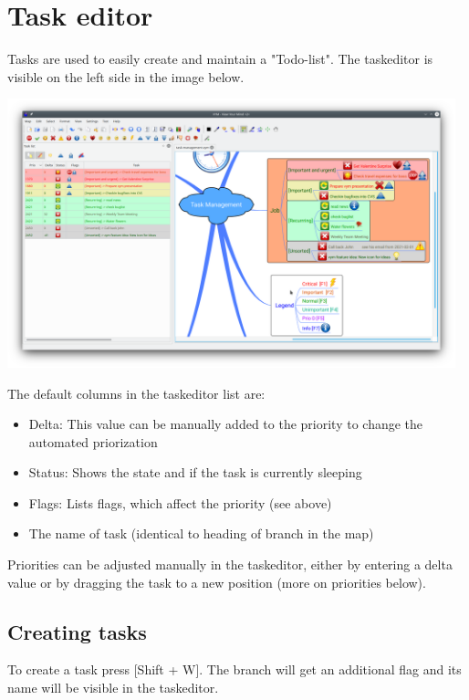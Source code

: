 \documentclass[12pt,a4paper]{article}
\newcommand{\key}[1]{[#1]}
\begin{document}
\section{Task editor} \label{taskeditor}
Tasks are used to easily create and maintain a "Todo-list". 
The taskeditor is visible on the left side in the image below. 
\begin{center}
    \includegraphics[width=13cm]{images/taskeditor.png}
\end{center}

The default columns in the taskeditor list are:
\begin{itemize}
    \item Delta: This value can be manually added to the priority to change the automated priorization
    \item Status: Shows the state and if the task is currently sleeping
    \item Flags: Lists flags, which affect the priority (see above)
    \item The name of task (identical to heading of branch in the map)    
\end{itemize}
Priorities can be adjusted manually in the taskeditor, either by entering a
delta value or by dragging the task to a new position (more on priorities below).


\subsection{Creating tasks}
To create a task press \key{Shift + W}. The branch will get an
additional flag and its name will be visible in the taskeditor.
\end{document}
